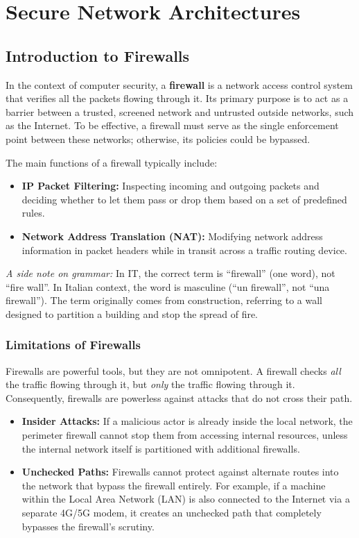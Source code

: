 \chapter{Secure Network Architectures}
\label{ch:secure_network_architectures}

\section{Introduction to Firewalls}

In the context of computer security, a \textbf{firewall} is a network access control system that verifies all the packets flowing through it. Its primary purpose is to act as a barrier between a trusted, screened network and untrusted outside networks, such as the Internet. To be effective, a firewall must serve as the single enforcement point between these networks; otherwise, its policies could be bypassed.

The main functions of a firewall typically include:
\begin{itemize}
    \item \textbf{IP Packet Filtering:} Inspecting incoming and outgoing packets and deciding whether to let them pass or drop them based on a set of predefined rules.
    \item \textbf{Network Address Translation (NAT):} Modifying network address information in packet headers while in transit across a traffic routing device.
\end{itemize}

\textit{A side note on grammar:} In IT, the correct term is ``firewall'' (one word), not ``fire wall''. In Italian context, the word is masculine (``un firewall'', not ``una firewall''). The term originally comes from construction, referring to a wall designed to partition a building and stop the spread of fire.

\subsection{Limitations of Firewalls}

Firewalls are powerful tools, but they are not omnipotent. A firewall checks \textit{all} the traffic flowing through it, but \textit{only} the traffic flowing through it. Consequently, firewalls are powerless against attacks that do not cross their path.

\begin{itemize}
    \item \textbf{Insider Attacks:} If a malicious actor is already inside the local network, the perimeter firewall cannot stop them from accessing internal resources, unless the internal network itself is partitioned with additional firewalls.
    \item \textbf{Unchecked Paths:} Firewalls cannot protect against alternate routes into the network that bypass the firewall entirely. For example, if a machine within the Local Area Network (LAN) is also connected to the Internet via a separate 4G/5G modem, it creates an unchecked path that completely bypasses the firewall's scrutiny.
\end{itemize}

